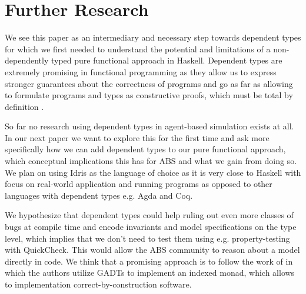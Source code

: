 \section{Further Research}
\label{sec:further_research}
We see this paper as an intermediary and necessary step towards dependent types for which we first needed to understand the potential and limitations of a non-dependently typed pure functional approach in Haskell. Dependent types are extremely promising in functional programming as they allow us to express stronger guarantees about the correctness of programs and go as far as allowing to formulate programs and types as constructive proofs, which must be total by definition \cite{thompson_type_1991, mckinna_why_2006, altenkirch_pi_2010}.

So far no research using dependent types in agent-based simulation exists at all. In our next paper we want to explore this for the first time and ask more specifically how we can add dependent types to our pure functional approach, which conceptual implications this has for ABS and what we gain from doing so. We plan on using Idris \cite{brady_idris_2013} as the language of choice as it is very close to Haskell with focus on real-world application and running programs as opposed to other languages with dependent types e.g. Agda and Coq.

We hypothesize that dependent types could help ruling out even more classes of bugs at compile time and encode invariants and model specifications on the type level, which implies that we don't need to test them using e.g. property-testing with QuickCheck. This would allow the ABS community to reason about a model directly in code. We think that a promising approach is to follow the work of \cite{brady_correct-by-construction_2010, brady_idris_2011, brady_programming_2013, fowler_dependent_2014, brady_state_2016} in which the authors utilize GADTs to implement an indexed monad, which allows to implementation correct-by-construction software.

